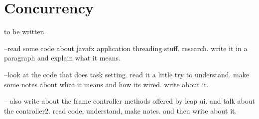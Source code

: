 
\section{Concurrency}
to be written..


--read some code about javafx application threading stuff. research. 
write it in a paragraph and explain what it means. 

--look at the code that does task setting. read it a little try to understand. make some notes about what it means and how its wired. 
write about it. 

-- also write about the frame controller methods offered by leap ui. and talk about the controller2. read code, understand, make notes. and then write about it. 




